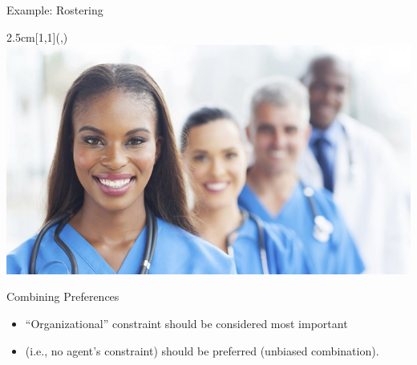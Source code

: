 \begin{frame}{Example: Rostering}
\begin{textblock*}{2.5cm}[1,1](\textwidth-2cm,\textheight-7.03cm)
\includegraphics[width=\textwidth]{img/nurse.jpg}
\end{textblock*}

\end{frame}

\begin{frame}{Combining Preferences}


\vspace*{2ex}

\begin{itemize}
\item ``Organizational'' constraint should be considered most important
\item {} (i.e., no agent's constraint) should be preferred (unbiased combination).
\end{itemize}
\end{frame}


